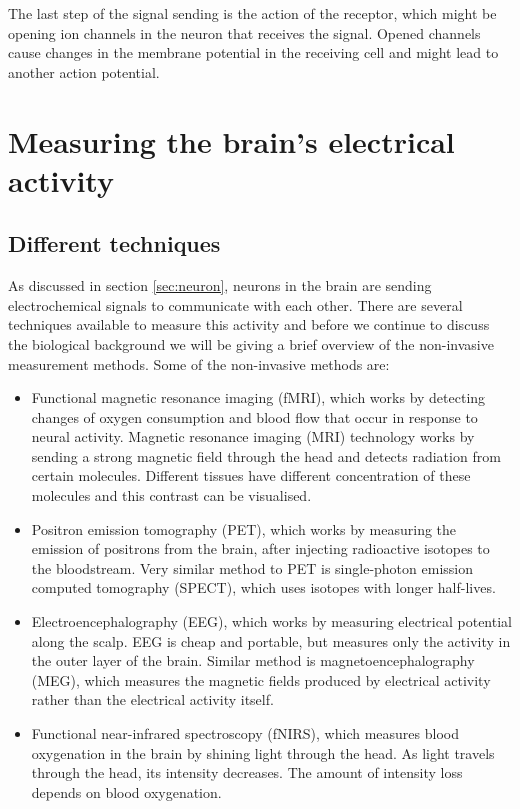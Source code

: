 The last step of the signal sending is the action of the receptor, which might be opening ion channels in the neuron that receives the signal. Opened channels cause changes in the membrane potential in the receiving cell and might lead to another action potential.

\section{Measuring the brain's electrical activity}
\subsection{Different techniques}

As discussed in section \ref{sec:neuron}, neurons in the brain are sending electrochemical signals to communicate with each other. There are several techniques available to measure this activity and before we continue to discuss the biological background we will be giving a brief overview of the non-invasive measurement methods. Some of the non-invasive methods are:
\begin{itemize}
	\item Functional magnetic resonance imaging (fMRI), which works by detecting changes of oxygen consumption and blood flow that occur in response to neural activity. Magnetic resonance imaging (MRI) technology works by sending a strong magnetic field through the head and detects radiation from certain molecules. Different tissues have different concentration of these molecules and this contrast can be visualised.
	\item Positron emission tomography (PET), which works by measuring the emission of positrons from the brain, after injecting radioactive isotopes to the bloodstream. Very similar method to PET is single-photon emission computed tomography (SPECT), which uses isotopes with longer half-lives.
	\item Electroencephalography (EEG), which works by measuring electrical potential along the scalp. EEG is cheap and portable, but measures only the activity in the outer layer of the brain. Similar method is magnetoencephalography (MEG), which measures the magnetic fields produced by electrical activity rather than the electrical activity itself.
	\item Functional near-infrared spectroscopy (fNIRS), which measures blood oxygenation in the brain by shining light through the head. As light travels through the head, its intensity decreases. The amount of intensity loss depends on blood oxygenation.
\end{itemize}

